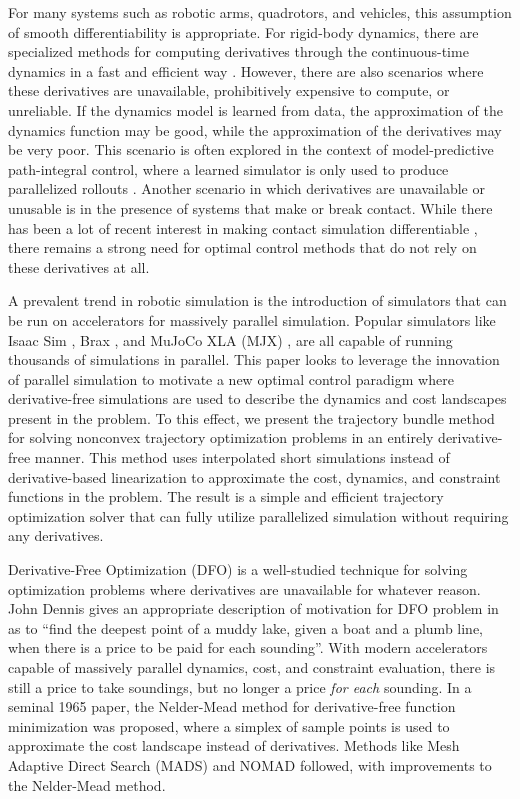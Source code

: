 For many systems such as robotic arms, quadrotors, and vehicles, this assumption of smooth differentiability is appropriate. For rigid-body dynamics, there are specialized methods for computing derivatives through the continuous-time dynamics in a fast and efficient way \cite{featherstone1987}. However, there are also scenarios where these derivatives are unavailable, prohibitively expensive to compute, or unreliable. If the dynamics model is learned from data, the approximation of the dynamics function may be good, while the approximation of the derivatives may be very poor. This scenario is often explored in the context of model-predictive path-integral control, where a learned simulator is only used to produce parallelized rollouts \cite{williams2016, wagener2019}. Another scenario in which derivatives are unavailable or unusable is in the presence of systems that make or break contact. While there has been a lot of recent interest in making contact simulation differentiable \cite{freeman2021, newbury2024, pang2023, tracy2023b, suh2022a, howell2022}, there remains a strong need for optimal control methods that do not rely on these derivatives at all.  

A prevalent trend in robotic simulation is the introduction of simulators that can be run on accelerators for massively parallel simulation. Popular simulators like Isaac Sim \cite{makoviychuk2021, mittal2023}, Brax \cite{freeman2021}, and MuJoCo XLA (MJX) \cite{todorov2012}, are all capable of running thousands of simulations in parallel. This paper looks to leverage the innovation of parallel simulation to motivate a new optimal control paradigm where derivative-free simulations are used to describe the dynamics and cost landscapes present in the problem. To this effect, we present the trajectory bundle method for solving nonconvex trajectory optimization problems in an entirely derivative-free manner. This method uses interpolated short simulations instead of derivative-based linearization to approximate the cost, dynamics, and constraint functions in the problem. The result is a simple and efficient trajectory optimization solver that can fully utilize parallelized simulation without requiring any derivatives. 

Derivative-Free Optimization (DFO) is a well-studied technique for solving optimization problems where derivatives are unavailable for whatever reason. John Dennis gives an appropriate description of motivation for DFO problem in \cite{powell1994} as to ``find the deepest point of a muddy lake,
given a boat and a plumb line, when there is a price to be paid for each sounding''. With modern accelerators capable of massively parallel dynamics, cost, and constraint evaluation, there is still a price to take soundings, but no longer a price \textit{for each} sounding.   In a seminal 1965 paper, the Nelder-Mead method for derivative-free function minimization was proposed, where a simplex of sample points is used to approximate the cost landscape instead of derivatives. Methods like Mesh Adaptive Direct Search (MADS) \cite{audet2006} and NOMAD \cite{ledigabel2011, audet2021} followed, with improvements to the Nelder-Mead method. 

